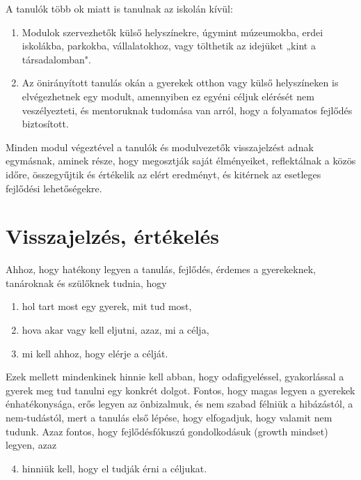 A tanulók több ok miatt is tanulnak az iskolán kívül:
\begin{enumerate}
  \item Modulok szervezhetők külső helyszínekre, úgymint múzeumokba, erdei
        iskolákba, parkokba, vállalatokhoz, vagy tölthetik az idejüket „kint a
        társadalomban".

  \item Az önirányított tanulás okán a gyerekek otthon vagy külső helyszíneken is
        elvégezhetnek egy modult, amennyiben ez egyéni céljuk elérését nem
        veszélyezteti, és mentoruknak tudomása van arról, hogy a folyamatos fejlődés
        biztosított.
\end{enumerate}

Minden modul végeztével a tanulók és modulvezetők visszajelzést adnak
egymásnak, aminek része, hogy megosztják saját élményeiket, reflektálnak a
közös időre, összegyűjtik és értékelik az elért eredményt, és kitérnek az
esetleges fejlődési lehetőségekre.

\section{Visszajelzés, értékelés}
\label{sec:ertekeles}
Ahhoz, hogy hatékony legyen a tanulás, fejlődés, érdemes a gyerekeknek,
tanároknak és szülőknek tudnia, hogy
\begin{enumerate}
  \item hol tart most egy gyerek, mit tud most,
  \item hova akar vagy kell eljutni, azaz, mi a célja,
  \item mi kell ahhoz, hogy elérje a célját.
\end{enumerate}
Ezek mellett mindenkinek hinnie kell abban, hogy odafigyeléssel, gyakorlással a
gyerek meg tud tanulni egy konkrét dolgot. Fontos, hogy magas legyen a gyerekek
énhatékonysága,  erős legyen az önbizalmuk, és nem szabad félniük a hibázástól, a nem-tudástól,
mert a tanulás első lépése, hogy elfogadjuk, hogy valamit nem tudunk. Azaz
fontos, hogy fejlődésfókuszú gondolkodásuk (growth mindset)
\citep{growthmindset} legyen, azaz
\begin{enumerate}
  \setcounter{enumi}{3}
  \item hinniük kell, hogy el tudják érni a céljukat.
\end{enumerate}

